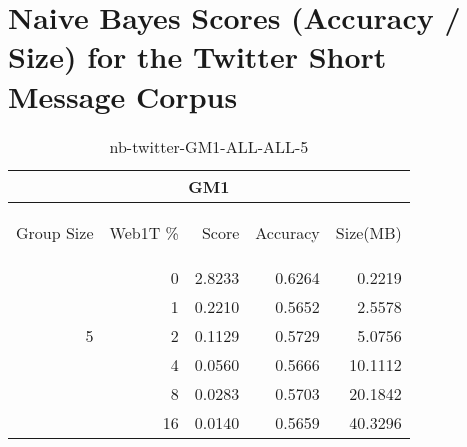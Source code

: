 \chapter{Naive Bayes Scores (Accuracy / Size) for the Twitter Short Message Corpus}

\begin{center}
\begin{table}[htbp] 
 \begin{center}
\begin{tabular}{ | r | r | r | r | r |}
\hline
\multicolumn{5}{|c|}{GM1}\\
\hline
\begin{sideways}Group Size\end{sideways} & \begin{sideways}Web1T \%\end{sideways} & \begin{sideways}Score\end{sideways} & \begin{sideways}Accuracy\end{sideways} & \begin{sideways}Size(MB)\end{sideways}\\
\hline
\multirow{5}{*}{5}
 & 0 & 2.8233 & 0.6264 & 0.2219\\ \cline{2-5}
 & 1 & 0.2210 & 0.5652 & 2.5578\\ \cline{2-5}
 & 2 & 0.1129 & 0.5729 & 5.0756\\ \cline{2-5}
 & 4 & 0.0560 & 0.5666 & 10.1112\\ \cline{2-5}
 & 8 & 0.0283 & 0.5703 & 20.1842\\ \cline{2-5}
 & 16 & 0.0140 & 0.5659 & 40.3296\\ \cline{2-5}
\hline
\end{tabular}
\caption{nb-twitter-GM1-ALL-ALL-5}
\label{table:nb-twitter-GM1-ALL-ALL-5}
\end{center}
 \end{table}
\end{center}

